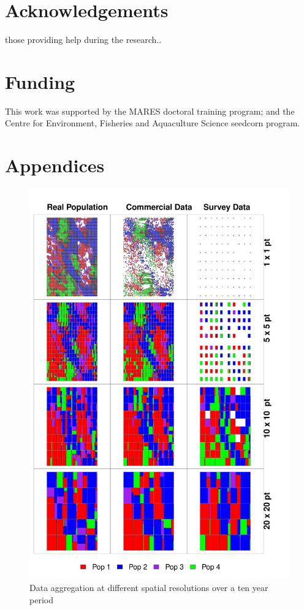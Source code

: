 \documentclass[review]{elsarticle}
\begin{document}
\section*{Acknowledgements} those providing help during the research..

\section*{Funding} This work was supported by the MARES doctoral training
program; and the Centre for Environment, Fisheries and Aquaculture Science
seedcorn program.

\section*{Appendices}



\clearpage
\footnotesize


\clearpage
\footnotesize



\begin{figure}[!ht]
	\includegraphics[width =\linewidth]{../analysis/Data_Aggregation_space}
	\caption{Data aggregation at different spatial resolutions over a
		ten year period}
	\label{fig:1}
\end{figure}	
\end{document}
